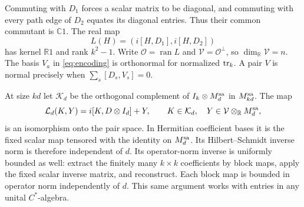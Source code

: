\documentclass[11pt]{article}
\theoremstyle{definition}\newtheorem{definition}[theorem]{Definition}
\theoremstyle{remark}\newtheorem{remark}[theorem]{Remark}
\newcommand{\C}{\mathbb C}\newcommand{\R}{\mathbb R}
\begin{document}
Commuting with $D_1$ forces a scalar matrix to be diagonal, and commuting
with every path edge of $D_2$ equates its diagonal entries. Thus their
common commutant is $\C1$. The real map
\[
 L(H)=(i[H,D_1],i[H,D_2])
\]
has kernel $\R1$ and rank $k^2-1$. Write $\mathcal O=\operatorname{ran}L$
and $\mathcal V=\mathcal O^\perp$, so $\dim_\R\mathcal V=n$.
The basis $V_a$ in \eqref{eq:encoding} is orthonormal for normalized
$\operatorname{tr}_k$. A pair $V$ is normal precisely when
$\sum_s[D_s,V_s]=0$.

At size $kd$ let $\mathcal K_d$ be the orthogonal complement of
$I_k\otimes M_d^{\mathrm{sa}}$ in $M_{kd}^{\mathrm{sa}}$. The map
\begin{equation}\label{eq:linear-chart}
 \mathcal L_d(K,Y)=i[K,D\otimes I_d]+Y,
 \qquad K\in\mathcal K_d,\quad Y\in\mathcal V\otimes_\R M_d^{\sa},
\end{equation}
is an isomorphism onto the pair space. In Hermitian coefficient bases it
is the fixed scalar map tensored with the identity on $M_d^{\mathrm{sa}}$.
Its Hilbert--Schmidt inverse norm is therefore independent of $d$.
Its operator-norm inverse is uniformly bounded as well: extract the
finitely many $k\times k$ coefficients by block maps, apply the fixed
scalar inverse matrix, and reconstruct. Each block map is bounded in
operator norm independently of $d$. This same argument works with
entries in any unital $C^*$-algebra.
\end{document}

